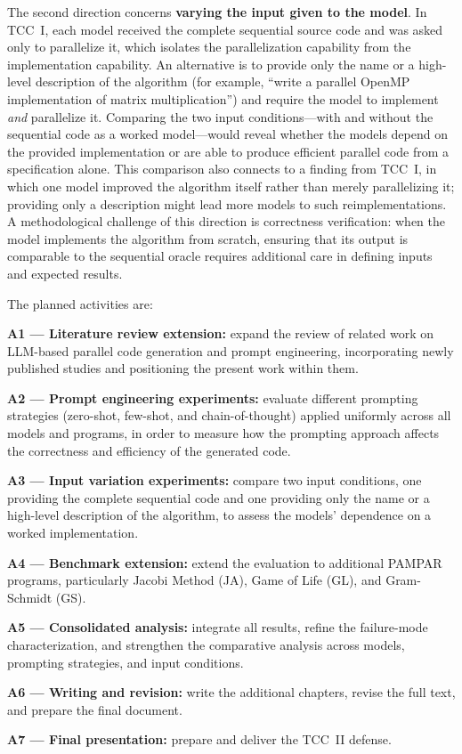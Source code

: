 The second direction concerns \textbf{varying the input given to the model}. In
TCC~I, each model received the complete sequential source code and was asked
only to parallelize it, which isolates the parallelization capability from the
implementation capability. An alternative is to provide only the name or a
high-level description of the algorithm (for example, ``write a parallel OpenMP
implementation of matrix multiplication'') and require the model to implement
\emph{and} parallelize it. Comparing the two input conditions---with and without
the sequential code as a worked model---would reveal whether the models depend on
the provided implementation or are able to produce efficient parallel code from a
specification alone. This comparison also connects to a finding from TCC~I, in
which one model improved the algorithm itself rather than merely parallelizing
it; providing only a description might lead more models to such reimplementations.
A methodological challenge of this direction is correctness verification: when the
model implements the algorithm from scratch, ensuring that its output is
comparable to the sequential oracle requires additional care in defining inputs
and expected results.

The planned activities are:

\begin{alineas}
\item \textbf{A1 --- Literature review extension:} expand the review of related
work on LLM-based parallel code generation and prompt engineering, incorporating
newly published studies and positioning the present work within them.
\item \textbf{A2 --- Prompt engineering experiments:} evaluate different
prompting strategies (zero-shot, few-shot, and chain-of-thought) applied
uniformly across all models and programs, in order to measure how the prompting
approach affects the correctness and efficiency of the generated code.
\item \textbf{A3 --- Input variation experiments:} compare two input conditions,
one providing the complete sequential code and one providing only the name or a
high-level description of the algorithm, to assess the models' dependence on a
worked implementation.
\item \textbf{A4 --- Benchmark extension:} extend the evaluation to additional
PAMPAR programs, particularly Jacobi Method (JA), Game of Life (GL), and
Gram-Schmidt (GS).
\item \textbf{A5 --- Consolidated analysis:} integrate all results, refine the
failure-mode characterization, and strengthen the comparative analysis across
models, prompting strategies, and input conditions.
\item \textbf{A6 --- Writing and revision:} write the additional chapters,
revise the full text, and prepare the final document.
\item \textbf{A7 --- Final presentation:} prepare and deliver the TCC~II
defense.
\end{alineas}

